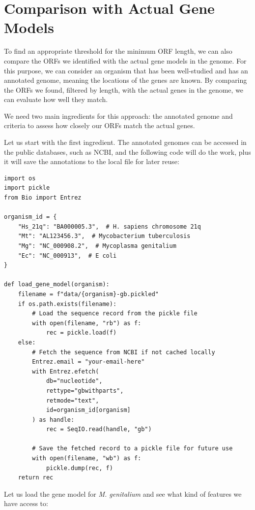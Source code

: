 \section{Comparison with Actual Gene Models}

To find an appropriate threshold for the minimum ORF length, we can also compare the ORFs we identified with the actual gene models in the genome. For this purpose, we can consider an organism that has been well-studied and has an annotated genome, meaning the locations of the genes are known. By comparing the ORFs we found, filtered by length, with the actual genes in the genome, we can evaluate how well they match.

We need two main ingredients for this approach: the annotated genome and criteria to assess how closely our ORFs match the actual genes.

Let us start with the first ingredient. The annotated genomes can be accessed in the public databases, such as NCBI, and the following code will do the work, plus it will save the annotations to the local file for later reuse:

\vspace*{3mm}
\begin{lstlisting}
import os
import pickle
from Bio import Entrez

organism_id = {
    "Hs_21q": "BA000005.3",  # H. sapiens chromosome 21q
    "Mt": "AL123456.3",  # Mycobacterium tuberculosis
    "Mg": "NC_000908.2",  # Mycoplasma genitalium
    "Ec": "NC_000913",  # E coli
}

def load_gene_model(organism):
    filename = f"data/{organism}-gb.pickled"
    if os.path.exists(filename):
        # Load the sequence record from the pickle file
        with open(filename, "rb") as f:
            rec = pickle.load(f)
    else:
        # Fetch the sequence from NCBI if not cached locally
        Entrez.email = "your-email-here"
        with Entrez.efetch(
            db="nucleotide",
            rettype="gbwithparts",
            retmode="text",
            id=organism_id[organism]
        ) as handle:
            rec = SeqIO.read(handle, "gb")
        
        # Save the fetched record to a pickle file for future use
        with open(filename, "wb") as f:
            pickle.dump(rec, f)
    return rec
\end{lstlisting}

Let us load the gene model for {\em M. genitalium} and see what kind of features we have access to:

